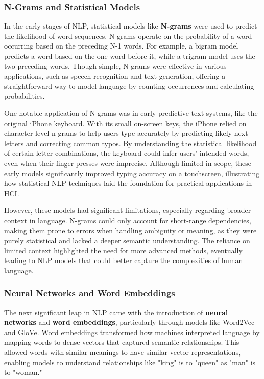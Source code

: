 \subsubsection{N-Grams and Statistical Models}

In the early stages of NLP, statistical models like \textbf{N-grams} were used to predict the likelihood of word sequences.
N-grams operate on the probability of a word occurring based on the preceding N-1 words.
For example, a bigram model predicts a word based on the one word before it, while a trigram model uses the two preceding words.
Though simple, N-grams were effective in various applications, such as speech recognition and text generation, offering a straightforward way to model language by counting occurrences and calculating probabilities.

One notable application of N-grams was in early predictive text systems, like the original iPhone keyboard\cite{kocienda2018creative}.
With its small on-screen keys, the iPhone relied on character-level n-grams to help users type accurately by predicting likely next letters and correcting common typos.
By understanding the statistical likelihood of certain letter combinations, the keyboard could infer users' intended words, even when their finger presses were imprecise.
Although limited in scope, these early models significantly improved typing accuracy on a touchscreen, illustrating how statistical NLP techniques laid the foundation for practical applications in HCI.

However, these models had significant limitations, especially regarding broader context in language. N-grams could only account for short-range dependencies, making them prone to errors when handling ambiguity or meaning, as they were purely statistical and lacked a deeper semantic understanding.
The reliance on limited context highlighted the need for more advanced methods, eventually leading to NLP models that could better capture the complexities of human language.

\subsubsection{ Neural Networks and Word Embeddings}

The next significant leap in NLP came with the introduction of \textbf{neural networks} and \textbf{word embeddings}, particularly through models like Word2Vec \cite{rong2014word2vec} and GloVe\cite{pennington2014glove}.
Word embeddings transformed how machines interpreted language by mapping words to dense vectors that captured semantic relationships. This allowed words with similar meanings to have similar vector representations, enabling models to understand relationships like "king" is to "queen" as "man" is to "woman."

